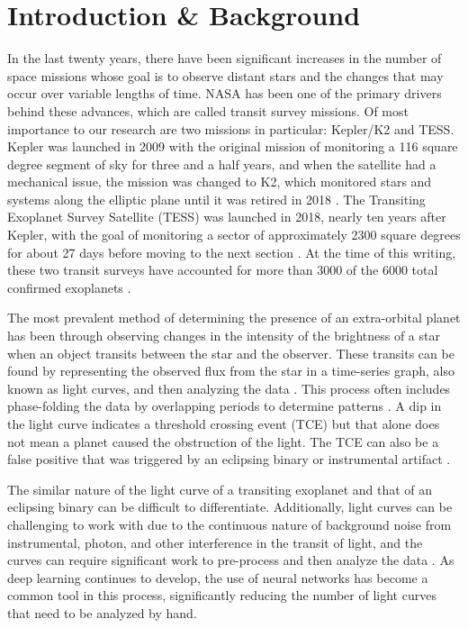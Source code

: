 \documentclass[letterpaper]{article} %
\begin{document}
\section*{Introduction \& Background}
In the last twenty years, there have been significant increases in the number of space missions whose goal is to observe distant stars and the changes that may occur over variable lengths of time. NASA has been one of the primary drivers behind these advances, which are called transit survey missions. Of most importance to our research are two missions in particular: Kepler/K2 and TESS. Kepler was launched in 2009 with the original mission of monitoring a 116 square degree segment of sky for three and a half years, and when the satellite had a mechanical issue, the mission was changed to K2, which monitored stars and systems along the elliptic plane until it was retired in 2018 \cite{salinas2023distinguishingtransitfalsepositives}. The Transiting Exoplanet Survey Satellite (TESS) was launched in 2018, nearly ten years after Kepler, with the goal of monitoring a sector of approximately 2300 square degrees for about 27 days before moving to the next section \cite{salinas2023distinguishingtransitfalsepositives}. At the time of this writing, these two transit surveys have accounted for more than 3000 of the 6000 total confirmed exoplanets \cite{salinas2025tessfullframe}.

The most prevalent method of determining the presence of an extra-orbital planet has been through observing changes in the intensity of the brightness of a star when an object transits between the star and the observer. These transits can be found by representing the observed flux from the star in a time-series graph, also known as light curves, and then analyzing the data \cite{morvan2022dontpayattentionnoise}. This process often includes phase-folding the data by overlapping periods to determine patterns \cite{salinas2023distinguishingtransitfalsepositives}. A dip in the light curve indicates a threshold crossing event (TCE) but that alone does not mean a planet caused the obstruction of the light. The TCE can also be a false positive that was triggered by an eclipsing binary or instrumental artifact \cite{salinas2025tessfullframe}.

The similar nature of the light curve of a transiting exoplanet and that of an eclipsing binary can be difficult to differentiate. Additionally, light curves can be challenging to work with due to the continuous nature of background noise from instrumental, photon, and other interference in the transit of light, and the curves can require significant work to pre-process and then analyze the data \cite{morvan2022dontpayattentionnoise}. As deep learning continues to develop, the use of neural networks has become a common tool in this process, significantly reducing the number of light curves that need to be analyzed by hand.
\end{document}
